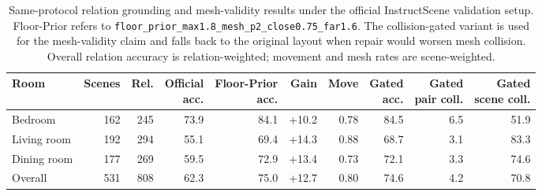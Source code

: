 
\begin{table}[t]
\centering
\small
\caption{Same-protocol relation grounding and mesh-validity results under the official InstructScene validation setup. Floor-Prior refers to \texttt{floor\_prior\_max1.8\_mesh\_p2\_close0.75\_far1.6}. The collision-gated variant is used for the mesh-validity claim and falls back to the original layout when repair would worsen mesh collision. Overall relation accuracy is relation-weighted; movement and mesh rates are scene-weighted.}
\label{tab:same_protocol_main}
\begin{tabular}{lrrrrrrrrr}
\toprule
Room & Scenes & Rel. & \makecell{Official\\acc.} & \makecell{Floor-Prior\\acc.} & Gain & Move & \makecell{Gated\\acc.} & \makecell{Gated\\pair coll.} & \makecell{Gated\\scene coll.} \\
\midrule
Bedroom & 162 & 245 & 73.9 & 84.1 & +10.2 & 0.78 & 84.5 & 6.5 & 51.9 \\
Living room & 192 & 294 & 55.1 & 69.4 & +14.3 & 0.88 & 68.7 & 3.1 & 83.3 \\
Dining room & 177 & 269 & 59.5 & 72.9 & +13.4 & 0.73 & 72.1 & 3.3 & 74.6 \\
\midrule
Overall & 531 & 808 & 62.3 & 75.0 & +12.7 & 0.80 & 74.6 & 4.2 & 70.8 \\
\bottomrule
\end{tabular}
\end{table}

